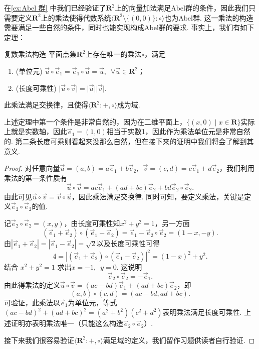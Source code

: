 在\autoref{ex:Abel 群} 中我们已经验证了$\mathbf{R}^2$上的向量加法满足Abel群的条件，因此我们只需要定义$\mathbf{R}^2$上的乘法使得代数系统$\langle\mathbf{R}^2\setminus\{(0,0)\}\colon\circ\rangle$也为Abel群. 这一乘法的构造需要满足一些自然的条件，同时也能实现构成Abel群的要求. 事实上，我们有如下定理：
\begin{theorem}{}{复数乘法构造}
    平面点集$\mathbf{R}^2$上存在唯一的乘法$\circ$，满足
    \begin{enumerate}
        \item (单位元) $\vec{u}\circ\vec{e}_1=\vec{e}_1\circ\vec{u}=\vec{u},\enspace\forall\vec{u}\in\mathbf{R}^2$；

        \item (长度可乘性) $\lvert\vec{u}\circ\vec{v}\rvert=\lvert\vec{u}\rvert\lvert\vec{v}\rvert$.
    \end{enumerate}
    此乘法满足交换律，且使得$\langle\mathbf{R}^2\colon+,\circ\rangle$成为域.
\end{theorem}

上述定理中第一个条件是非常自然的，因为在二维平面上，$\{(x,0) \mid x\in\mathbf{R}\}$实际上就是实数轴，因此$\vec{e}_1=(1,0)$相当于实数1，因此作为乘法单位元是非常自然的. 第二条长度可乘则看起来没那么自然，但在接下来的证明中我们将会了解到其意义.

\begin{proof}
    对任意向量$\vec{u}=(a,b)=a\vec{e}_1+b\vec{e}_2,\enspace \vec{v}=(c,d)=c\vec{e}_1+d\vec{e}_2$，我们利用乘法的第一条性质有
    \[\vec{u}\circ\vec{v}=ac\vec{e}_1+(ad+bc)\vec{e}_2+bd\vec{e}_2\circ\vec{e}_2.\]
    由此可见$\vec{u}\circ\vec{v}=\vec{v}\circ\vec{u}$，因此乘法满足交换律. 同时可知，要定义乘法，关键是定义$\vec{e}_2\circ\vec{e}_2$的值.

    记$\vec{e}_2\circ\vec{e}_2=(x,y)$，由长度可乘性知$x^2+y^2=1$，另一方面
    \[(\vec{e}_1+\vec{e}_2)\circ(\vec{e}_1-\vec{e}_2)=\vec{e}_1-\vec{e}_2\circ\vec{e}_2=(1-x,-y).\]
    由$|\vec{e}_1+\vec{e}_2|=|\vec{e}_1-\vec{e}_2|=\sqrt{2}$以及长度可乘性可得
    \[4=|(\vec{e}_1+\vec{e}_2)\circ(\vec{e}_1-\vec{e}_2)|^2=(1-x)^2+y^2.\]
    结合 $x^2+y^2=1$ 求出$x=-1,\enspace y=0$. 这说明
    \[\vec{e}_2\circ\vec{e}_2=-\vec{e}_1.\]
    由此得乘法的定义$\vec{u}\circ\vec{v}=(ac-bd)\vec{e}_1+(ad+bc)\vec{e}_2$，即
    \[(a,b)\circ(c,d)=(ac-bd,ad+bc).\]
    可验证，此乘法以$\vec{e}_1$为单位元，等式$(ac-bd)^2+(ad+bc)^2=(a^2+b^2)(c^2+d^2)$表明乘法满足长度可乘性. 上述证明亦表明乘法唯一（只能这么构造$\vec{e}_2\circ\vec{e}_2$）.

    接下来我们很容易验证$\langle\mathbf{R}^2\colon+,\circ\rangle$满足域的定义，我们留作习题供读者自行验证.
\end{proof}

